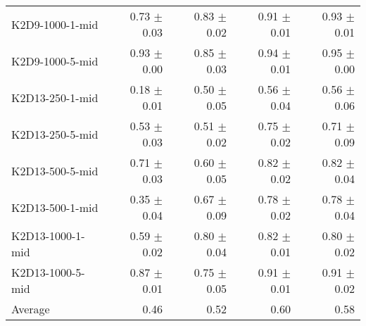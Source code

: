 \begin{table}[ht]
\begin{center}
\begin{small}
\begin{adjustbox}{max width=\columnwidth}
\begin{tabular}{l|rrrr}
K2D9-1000-1-mid & 0.73 $\pm$ 0.03 & 0.83 $\pm$ 0.02 & 0.91 $\pm$ 0.01 & 0.93 $\pm$ 0.01\\
K2D9-1000-5-mid & 0.93 $\pm$ 0.00 & 0.85 $\pm$ 0.03 & 0.94 $\pm$ 0.01 & 0.95 $\pm$ 0.00\\
K2D13-250-1-mid & 0.18 $\pm$ 0.01 & 0.50 $\pm$ 0.05 & 0.56 $\pm$ 0.04 & 0.56 $\pm$ 0.06\\
K2D13-250-5-mid & 0.53 $\pm$ 0.03 & 0.51 $\pm$ 0.02 & 0.75 $\pm$ 0.02 & 0.71 $\pm$ 0.09\\
K2D13-500-5-mid & 0.71 $\pm$ 0.03 & 0.60 $\pm$ 0.05 & 0.82 $\pm$ 0.02 & 0.82 $\pm$ 0.04\\
K2D13-500-1-mid & 0.35 $\pm$ 0.04 & 0.67 $\pm$ 0.09 & 0.78 $\pm$ 0.02 & 0.78 $\pm$ 0.04\\
K2D13-1000-1-mid & 0.59 $\pm$ 0.02 & 0.80 $\pm$ 0.04 & 0.82 $\pm$ 0.01 & 0.80 $\pm$ 0.02\\
K2D13-1000-5-mid & 0.87 $\pm$ 0.01 & 0.75 $\pm$ 0.05 & 0.91 $\pm$ 0.01 & 0.91 $\pm$ 0.02\\
\midrule
Average & 0.46 & 0.52 & 0.60 & 0.58\\
\end{tabular}
        \end{adjustbox}
    \end{small}
    \end{center}
    \vskip -0.1in
\end{table}
    
